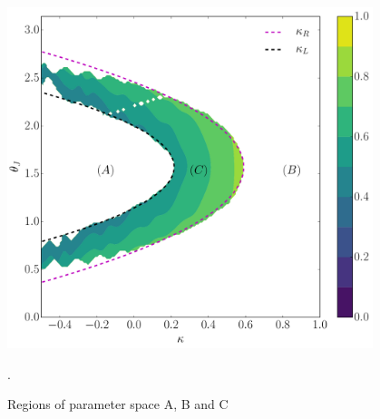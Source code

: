 \documentclass[final,hyperref={pdfpagelabels=false}, 11pt]{beamer}
\begin{document}
\begin{frame}[t]
\begin{columns}[t]
\begin{column}{.59\textwidth}
\begin{columns}[t]
\begin{column}{.32\textwidth}
\begin{figure}[!htb]
\includegraphics[width=\linewidth]{figures/OLVP_CUT.pdf}
\caption{Regions of parameter space A, B and C}.
\label{FIG:OLVPR}
\end{figure}
\end{column}

\end{columns} %
\end{column}

\begin{column}{.01\textwidth}\end{column} %
\end{columns} %


\end{frame}
\end{document}
